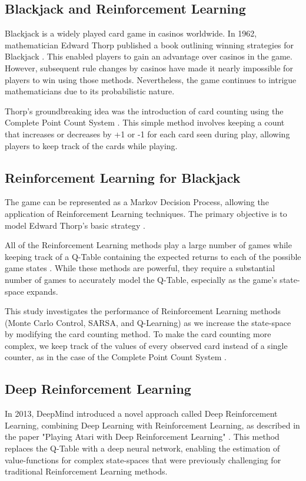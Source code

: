 \documentclass[conference]{IEEEtran}
\begin{document}
\subsection{Blackjack and Reinforcement Learning} 
Blackjack is a widely played card game in casinos worldwide. In 1962, mathematician Edward Thorp published a book outlining winning strategies for Blackjack \cite{b1}. This enabled players to gain an advantage over casinos in the game. However, subsequent rule changes by casinos have made it nearly impossible for players to win using those methods. Nevertheless, the game continues to intrigue mathematicians due to its probabilistic nature.

Thorp's groundbreaking idea was the introduction of card counting using the Complete Point Count System \cite{b1}. This simple method involves keeping a count that increases or decreases by +1 or -1 for each card seen during play, allowing players to keep track of the cards while playing.

\subsection{Reinforcement Learning for Blackjack}
The game can be represented as a Markov Decision Process, allowing the application of Reinforcement Learning techniques. The primary objective is to model Edward Thorp's basic strategy \cite{b1}.

All of the Reinforcement Learning methods play a large number of games while keeping track of a Q-Table containing the expected returns to each of the possible game states \cite{b4}.
While these methods are powerful, they require a substantial number of games to accurately model the Q-Table, especially as the game's state-space expands.

This study investigates the performance of Reinforcement Learning methods (Monte Carlo Control, SARSA, and Q-Learning) as we increase the state-space by modifying the card counting method. To make the card counting more complex, we keep track of the values of every observed card instead of a single counter, as in the case of the Complete Point Count System \cite{b1}.

\subsection{Deep Reinforcement Learning}
In 2013, DeepMind introduced a novel approach called Deep Reinforcement Learning, combining Deep Learning with Reinforcement Learning, as described in the paper "Playing Atari with Deep Reinforcement Learning" \cite{b2}. This method replaces the Q-Table with a deep neural network, enabling the estimation of value-functions for complex state-spaces that were previously challenging for traditional Reinforcement Learning methods.
\end{document}
